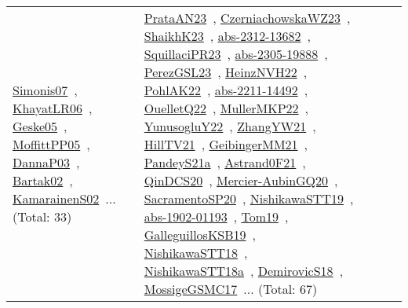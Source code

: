 {\begin{longtable}{lp{3cm}>{\raggedright\arraybackslash}p{6cm}>{\raggedright\arraybackslash}p{6cm}>{\raggedright\arraybackslash}p{8cm}}
\href{works/Simonis07.pdf}{Simonis07}~\cite{Simonis07}, \href{works/KhayatLR06.pdf}{KhayatLR06}~\cite{KhayatLR06}, \href{works/Geske05.pdf}{Geske05}~\cite{Geske05}, \href{works/MoffittPP05.pdf}{MoffittPP05}~\cite{MoffittPP05}, \href{works/DannaP03.pdf}{DannaP03}~\cite{DannaP03}, \href{works/Bartak02.pdf}{Bartak02}~\cite{Bartak02}, \href{works/KamarainenS02.pdf}{KamarainenS02}~\cite{KamarainenS02}... (Total: 33) & \href{works/PrataAN23.pdf}{PrataAN23}~\cite{PrataAN23}, \href{works/CzerniachowskaWZ23.pdf}{CzerniachowskaWZ23}~\cite{CzerniachowskaWZ23}, \href{works/ShaikhK23.pdf}{ShaikhK23}~\cite{ShaikhK23}, \href{works/abs-2312-13682.pdf}{abs-2312-13682}~\cite{abs-2312-13682}, \href{works/SquillaciPR23.pdf}{SquillaciPR23}~\cite{SquillaciPR23}, \href{works/abs-2305-19888.pdf}{abs-2305-19888}~\cite{abs-2305-19888}, \href{works/PerezGSL23.pdf}{PerezGSL23}~\cite{PerezGSL23}, \href{works/HeinzNVH22.pdf}{HeinzNVH22}~\cite{HeinzNVH22}, \href{works/PohlAK22.pdf}{PohlAK22}~\cite{PohlAK22}, \href{works/abs-2211-14492.pdf}{abs-2211-14492}~\cite{abs-2211-14492}, \href{works/OuelletQ22.pdf}{OuelletQ22}~\cite{OuelletQ22}, \href{works/MullerMKP22.pdf}{MullerMKP22}~\cite{MullerMKP22}, \href{works/YunusogluY22.pdf}{YunusogluY22}~\cite{YunusogluY22}, \href{works/ZhangYW21.pdf}{ZhangYW21}~\cite{ZhangYW21}, \href{works/HillTV21.pdf}{HillTV21}~\cite{HillTV21}, \href{works/GeibingerMM21.pdf}{GeibingerMM21}~\cite{GeibingerMM21}, \href{works/PandeyS21a.pdf}{PandeyS21a}~\cite{PandeyS21a}, \href{works/Astrand0F21.pdf}{Astrand0F21}~\cite{Astrand0F21}, \href{works/QinDCS20.pdf}{QinDCS20}~\cite{QinDCS20}, \href{works/Mercier-AubinGQ20.pdf}{Mercier-AubinGQ20}~\cite{Mercier-AubinGQ20}, \href{works/SacramentoSP20.pdf}{SacramentoSP20}~\cite{SacramentoSP20}, \href{works/NishikawaSTT19.pdf}{NishikawaSTT19}~\cite{NishikawaSTT19}, \href{works/abs-1902-01193.pdf}{abs-1902-01193}~\cite{abs-1902-01193}, \href{works/Tom19.pdf}{Tom19}~\cite{Tom19}, \href{works/GalleguillosKSB19.pdf}{GalleguillosKSB19}~\cite{GalleguillosKSB19}, \href{works/NishikawaSTT18.pdf}{NishikawaSTT18}~\cite{NishikawaSTT18}, \href{works/NishikawaSTT18a.pdf}{NishikawaSTT18a}~\cite{NishikawaSTT18a}, \href{works/DemirovicS18.pdf}{DemirovicS18}~\cite{DemirovicS18}, \href{works/MossigeGSMC17.pdf}{MossigeGSMC17}~\cite{MossigeGSMC17}... (Total: 67)\\

\end{longtable}}
